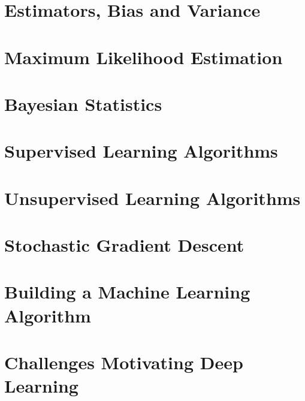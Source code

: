 \section{Estimators, Bias and Variance}

\section{Maximum Likelihood Estimation}

\section{Bayesian Statistics}

\section{Supervised Learning Algorithms}

\section{Unsupervised Learning Algorithms}

\section{Stochastic Gradient Descent}

\section{Building a Machine Learning Algorithm}

\section{Challenges Motivating Deep Learning}